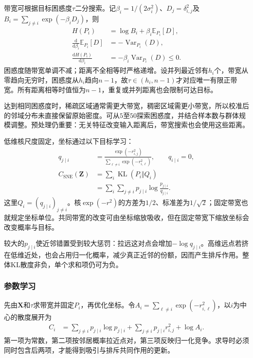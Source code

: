 带宽可根据目标困惑度$\tau$二分搜索。记$\beta_i=1/(2\sigma_i^2)$、$D_j=\delta_{i,j}^2$及$B_i=\sum_{j\ne i}\exp(-\beta_iD_j)$，则
\begin{equation}
  \label{eq:dim-sne-entropy-monotonicity}
  \begin{aligned}
    H(P_i)&=\log B_i+\beta_i\mathbb{E}_{P_i}[D],\\
    \frac{\mathrm{d}}{\mathrm{d}\beta_i}\mathbb{E}_{P_i}[D]
      &=-\operatorname{Var}_{P_i}(D),\\
    \frac{\mathrm{d}H(P_i)}{\mathrm{d}\beta_i}
      &=-\beta_i\operatorname{Var}_{P_i}(D)\leq 0.
  \end{aligned}
\end{equation}
困惑度随带宽单调不减；距离不全相等时严格递增。设并列最近邻有$h_i$个，带宽从零趋向无穷时，困惑度从$h_i$趋向$n-1$，故$\tau\in(h_i,n-1)$才对应唯一有限正带宽。所有距离相等时值恒为$n-1$，重复或并列距离也会限制可达目标。

达到相同困惑度时，稀疏区域通常需更大带宽，稠密区域需更小带宽，所以校准后的邻域分布未直接保留原始密度。可从$5$至$50$探索困惑度，并结合样本数与群体规模调整。预处理仍重要：无关特征改变输入距离后，带宽搜索也会使用这些距离。

低维核尺度固定，坐标通过以下目标学习：
\begin{equation}
  \label{eq:dim-sne-low-loss}
  \begin{aligned}
    q_{j\mid i}
      &=\frac{\exp(-r_{i,j}^2)}
      {\sum_{\ell\ne i}\exp(-r_{i,\ell}^2)},\qquad q_{i\mid i}=0,\\
    C_{\mathrm{SNE}}(\bm{Z})
      &=\sum_i\operatorname{KL}(P_i\Vert Q_i)\\
      &=\sum_i\sum_{j\ne i}p_{j\mid i}
        \log\frac{p_{j\mid i}}{q_{j\mid i}}.
  \end{aligned}
\end{equation}
这里$Q_i=(q_{j\mid i})_{j\ne i}$。核$\exp(-r^2)$的方差为$1/2$、标准差为$1/\sqrt{2}$；固定带宽也就规定坐标单位。共同带宽的改变可由坐标缩放吸收，但在固定带宽下缩放坐标会改变概率与目标。

较大的$p_{j\mid i}$使近邻错置受到较大惩罚：拉远这对点会增加$-\log q_{j\mid i}$。高维远点若挤在低维近处，也会占用归一化概率，减少真正近邻的份额，因而产生排斥作用。整体KL散度非负，单个求和项仍可为负。

\subsubsection{参数学习}

先由$\bm{X}$和$\tau$求带宽并固定$P_i$，再优化坐标。令$A_i=\sum_{\ell\ne i}\exp(-r_{i,\ell}^2)$，以$i$为中心的散度展开为
\begin{equation}
  \label{eq:dim-sne-anchor-loss}
  \begin{aligned}
    C_i&=\sum_{j\ne i}p_{j\mid i}\log p_{j\mid i}
      +\sum_{j\ne i}p_{j\mid i}r_{i,j}^2+\log A_i.
  \end{aligned}
\end{equation}
第一项为常数，第二项按邻居概率拉近点对，第三项反映归一化竞争。求导时必须同时包含后两项，才能得到吸引与排斥共同作用的更新。


